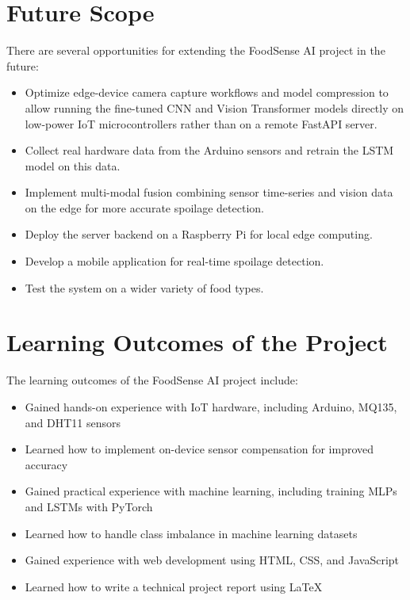 \section{Future Scope}
There are several opportunities for extending the FoodSense AI project in the future:
\begin{itemize}
    \item Optimize edge-device camera capture workflows and model compression to allow running the fine-tuned CNN and Vision Transformer models directly on low-power IoT microcontrollers rather than on a remote FastAPI server.
    \item Collect real hardware data from the Arduino sensors and retrain the LSTM model on this data.
    \item Implement multi-modal fusion combining sensor time-series and vision data on the edge for more accurate spoilage detection.
    \item Deploy the server backend on a Raspberry Pi for local edge computing.
    \item Develop a mobile application for real-time spoilage detection.
    \item Test the system on a wider variety of food types.
\end{itemize}

\section{Learning Outcomes of the Project}
The learning outcomes of the FoodSense AI project include:
\begin{itemize}
    \item Gained hands-on experience with IoT hardware, including Arduino, MQ135, and DHT11 sensors
    \item Learned how to implement on-device sensor compensation for improved accuracy
    \item Gained practical experience with machine learning, including training MLPs and LSTMs with PyTorch
    \item Learned how to handle class imbalance in machine learning datasets
    \item Gained experience with web development using HTML, CSS, and JavaScript
    \item Learned how to write a technical project report using LaTeX
\end{itemize}
